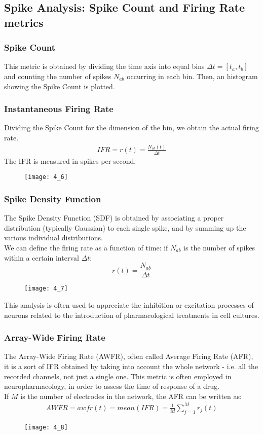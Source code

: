 \subsection{Spike Analysis: Spike Count and Firing Rate metrics}
\subsubsection{Spike Count}
This metric is obtained by dividing the time axis into equal bins \(\Delta{t}=[t_a,t_b]\) and
counting the number of spikes \(N_{ab}\) occurring in each bin.
Then, an histogram showing the Spike Count is plotted.
\subsubsection{Instantaneous Firing Rate}
Dividing the Spike Count for the dimension of the bin, we obtain the actual firing rate.
\begin{align*}
    IFR=r(t)=\frac{N_{ab}(t)}{\Delta{t}}
\end{align*}
The IFR is measured in spikes per second.
\begin{figure}[H]
    \texttt{[image: 4\_6]}
    \centering
\end{figure}
\subsubsection{Spike Density Function}
The Spike Density Function (SDF) is obtained by associating a proper distribution (typically Gaussian) to each single spike, and by summing up the various individual distributions.\\
We can define the firing rate as a function of time: if \(N_{ab}\) is the number of spikes within a certain interval \(\Delta t\):
\begin{equation*}
    r(t)=\frac{N_{ab}}{\Delta t}
\end{equation*}
\begin{figure}[H]
    \texttt{[image: 4\_7]}
    \centering
\end{figure}
This analysis is often used to appreciate the inhibition or excitation processes of neurons related to the introduction of pharmacological treatments in cell cultures.
\subsubsection{Array-Wide Firing Rate}
The Array-Wide Firing Rate (AWFR), often called Average Firing Rate (AFR), it is a sort of
IFR obtained by taking into account the whole network - i.e. all the recorded channels, not just a single one.
This metric is often employed in neuropharmacology, in order to assess the time of response of a drug.\\
If \(M\) is the number of electrodes in the network, the AFR can be written as:
\begin{align*}
    AWFR=awfr(t)=mean(IFR)=\frac{1}{M}\sum_{j=1}^{M}r_{j}(t)
\end{align*}
\begin{figure}[H]
    \texttt{[image: 4\_8]}
    \centering
\end{figure}
